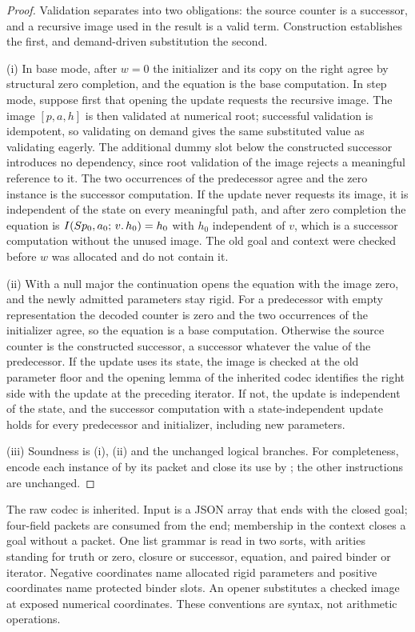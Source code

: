 \begin{proof}
Validation separates into two obligations: the source counter is a successor,
and a recursive image used in the result is a valid term. Construction
establishes the first, and demand-driven substitution the second.

(i) In base mode, after $w=0$ the initializer and its copy on the right agree
by structural zero completion, and the equation is the base computation. In
step mode, suppose first that opening the update requests the recursive image.
The image $[p,a,h]$ is then validated at numerical root; successful validation
is idempotent, so validating on demand gives the same substituted value as
validating eagerly. The additional dummy slot below the constructed successor
introduces no dependency, since root validation of the image rejects a
meaningful reference to it. The two occurrences of the predecessor agree and
the zero instance is the successor computation. If the update never requests
its image, it is independent of the state on every meaningful path, and after
zero completion the equation is $I(S p_0,a_0;\,v.\,h_0)=h_0$ with $h_0$
independent of $v$, which is a successor computation without the unused image.
The old goal and context were checked before $w$ was allocated and do not
contain it.

(ii) With a null major the continuation opens the equation with the image zero,
and the newly admitted parameters stay rigid. For a predecessor with empty
representation the decoded counter is zero and the two occurrences of the
initializer agree, so the equation is a base computation. Otherwise the source
counter is the constructed successor, a successor whatever the value of the
predecessor. If the update uses its state, the image is checked at the old
parameter floor and the opening lemma of the inherited codec identifies the
right side with the update at the preceding iterator. If not, the update is
independent of the state, and the successor computation with a
state-independent update holds for every predecessor and initializer, including
new parameters.

(iii) Soundness is (i), (ii) and the unchanged logical branches. For
completeness, encode each instance of  by its packet and close
its use by ; the other instructions are unchanged.
\end{proof}

The raw codec is inherited. Input is a JSON array that ends with the closed
goal; four-field packets are consumed from the end; membership in the context
closes a goal without a packet. One list grammar is read in two sorts, with
arities standing for truth or zero, closure or successor, equation, and paired
binder or iterator. Negative coordinates name allocated rigid parameters and
positive coordinates name protected binder slots. An opener substitutes a
checked image at exposed numerical coordinates. These conventions are syntax,
not arithmetic operations.

